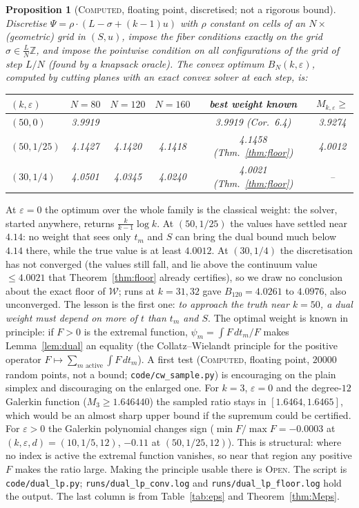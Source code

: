 \documentclass[11pt]{amsart}
\newtheorem{proposition}[theorem]{Proposition}
\theoremstyle{definition}
\theoremstyle{remark}
\newcommand{\lbl}[1]{\textup{\textsc{#1}}}
\begin{document}
\begin{proposition}[\lbl{Computed}, floating point, discretised; not a rigorous bound]\label{prop:family}
Discretise $\Psi=\rho\cdot(L-\sigma+(k-1)u)$ with $\rho$ constant on cells of
an $N\times{}$(geometric) grid in $(S,u)$, impose the fiber conditions exactly
on the grid $\sigma\in\frac LN\mathbb Z$, and impose the pointwise condition
on all configurations of the grid of step $L/N$ (found by a knapsack oracle).
The convex optimum $B_N(k,\varepsilon)$, computed by cutting planes with an
exact convex solver at each step, is:
\begin{center}
\begin{tabular}{@{}lccccc@{}}
\toprule
$(k,\varepsilon)$ & $N=80$ & $N=120$ & $N=160$ & best weight known & $M_{k,\varepsilon}\ge$\\
\midrule
$(50,0)$    & 3.9919 & & & 3.9919 (Cor.~6.4) & 3.9274\\
$(50,1/25)$ & 4.1427 & 4.1420 & 4.1418 & 4.1458 (Thm.~\ref{thm:floor}) & 4.0012\\
$(30,1/4)$  & 4.0501 & 4.0345 & 4.0240 & 4.0021 (Thm.~\ref{thm:floor}) & --\\
\bottomrule
\end{tabular}
\end{center}
\end{proposition}

At $\varepsilon=0$ the optimum over the whole family is the classical weight:
the solver, started anywhere, returns $\frac{k}{k-1}\log k$. At
$(50,1/25)$ the values have settled near $4.14$: no weight that sees only
$t_m$ and $S$ can bring the dual bound much below $4.14$ there, while the true
value is at least $4.0012$. At $(30,1/4)$ the discretisation has not
converged (the values still fall, and lie above the continuum value $\le4.0021$
that Theorem~\ref{thm:floor} already certifies), so we draw no conclusion about
the exact floor of $\mathcal W$; runs at $k=31,32$ gave $B_{120}=4.0261$ to
$4.0976$, also unconverged. The lesson is the first one: \emph{to approach the
truth near $k=50$, a dual weight must depend on more of $t$ than $t_m$ and
$S$}. The optimal weight is known in principle: if $F>0$ is the extremal
function, $\psi_m=\int F\,dt_m/F$ makes Lemma~\ref{lem:dual} an equality (the
Collatz--Wielandt principle for the positive operator
$F\mapsto\sum_{m\text{ active}}\int F\,dt_m$). A first test
(\lbl{Computed}, floating point, $20000$ random points, not a bound;
\texttt{code/cw\_sample.py}) is encouraging on the plain simplex and
discouraging on the enlarged one. For $k=3$, $\varepsilon=0$ and the
degree-$12$ Galerkin function ($M_3\ge1.646440$) the sampled ratio stays in
$[1.6464,1.6465]$, which would be an almost sharp upper bound if the supremum
could be certified. For $\varepsilon>0$ the Galerkin polynomial changes sign
($\min F/\max F=-0.0003$ at $(k,\varepsilon,d)=(10,1/5,12)$, $-0.11$ at
$(50,1/25,12)$). This is structural: where no index is active the extremal
function vanishes, so near that region any positive $F$ makes the ratio
large. Making the principle usable there is \lbl{Open}. The script is \texttt{code/dual\_lp.py};
\texttt{runs/dual\_lp\_conv.log} and \texttt{runs/dual\_lp\_floor.log} hold the
output. The last column is from Table~\ref{tab:eps} and
Theorem~\ref{thm:Meps}.
\end{document}
